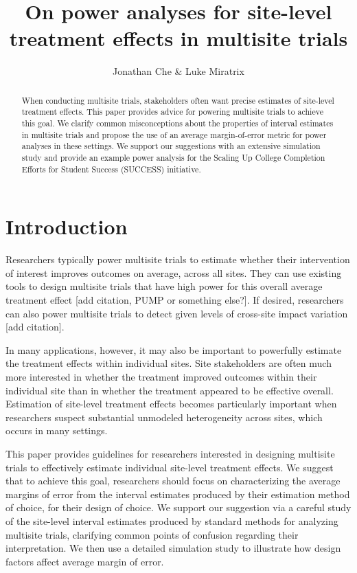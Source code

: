 \documentclass[]{article}
\title{On power analyses for site-level treatment effects in multisite trials}
\author{Jonathan Che \& Luke Miratrix}
\begin{document}
\maketitle


\begin{abstract}
    When conducting multisite trials, stakeholders often want precise estimates of site-level treatment effects.
    This paper provides advice for powering multisite trials to achieve this goal.
    We clarify common misconceptions about the properties of interval estimates in multisite trials and propose the use of an average margin-of-error metric for power analyses in these settings.
    We support our suggestions with an extensive simulation study and provide an example power analysis for the Scaling Up College Completion Efforts for Student Success (SUCCESS) initiative.
\end{abstract}

\section{Introduction}

Researchers typically power multisite trials to estimate whether their intervention of interest improves outcomes on average, across all sites.
They can use existing tools to design multisite trials that have high power for this overall average treatment effect [add citation, PUMP or something else?].
If desired, researchers can also power multisite trials to detect given levels of cross-site impact variation [add citation].

In many applications, however, it may also be important to powerfully estimate the treatment effects within individual sites.
Site stakeholders are often much more interested in whether the treatment improved outcomes within their individual site than in whether the treatment appeared to be effective overall.
Estimation of site-level treatment effects becomes particularly important when researchers suspect substantial unmodeled heterogeneity across sites, which occurs in many settings.

This paper provides guidelines for researchers interested in designing multisite trials to effectively estimate individual site-level treatment effects.
We suggest that to achieve this goal, researchers should focus on characterizing the average margins of error from the interval estimates produced by their estimation method of choice, for their design of choice.
We support our suggestion via a careful study of the site-level interval estimates produced by standard methods for analyzing multisite trials, clarifying common points of confusion regarding their interpretation.
We then use a detailed simulation study to illustrate how design factors affect average margin of error.
\end{document}
